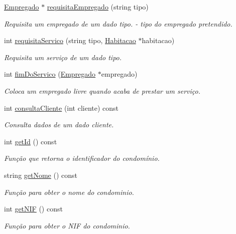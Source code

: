 \begin{DoxyCompactItemize}
\hyperlink{class_empregado}{Empregado} $\ast$ \hyperlink{class_condominio_a5eec0c5c3a1cb566332431939bcbcb56}{requisita\+Empregado} (string tipo)
\begin{DoxyCompactList}\small\item\em Requisita um empregado de um dado tipo.  -\/ tipo do empregado pretendido. \end{DoxyCompactList}\item 
int \hyperlink{class_condominio_adb5c91a9114dbc1c0f3c8c3e9f835152}{requisita\+Servico} (string tipo, \hyperlink{class_habitacao}{Habitacao} $\ast$habitacao)
\begin{DoxyCompactList}\small\item\em Requisita um serviço de um dado tipo. \end{DoxyCompactList}\item 
int \hyperlink{class_condominio_af2c2cdd83d43ea6641542efe01ff94b9}{fim\+Do\+Servico} (\hyperlink{class_empregado}{Empregado} $\ast$empregado)
\begin{DoxyCompactList}\small\item\em Coloca um empregado livre quando acaba de prestar um serviço. \end{DoxyCompactList}\item 
int \hyperlink{class_condominio_abfbd356bc26fde54dc40de2f9174f430}{consulta\+Cliente} (int cliente) const 
\begin{DoxyCompactList}\small\item\em Consulta dados de um dado cliente. \end{DoxyCompactList}\item 
int \hyperlink{class_condominio_a37df336e62f83189d9193f039e58935d}{get\+Id} () const 
\begin{DoxyCompactList}\small\item\em Função que retorna o identificador do condomínio. \end{DoxyCompactList}\item 
string \hyperlink{class_condominio_a7e358e29fa8b970fe11c8208aaadab95}{get\+Nome} () const 
\begin{DoxyCompactList}\small\item\em Função para obter o nome do condominio. \end{DoxyCompactList}\item 
int \hyperlink{class_condominio_a131891ab8b9ca504227ec3f9edcbc326}{get\+N\+IF} () const 
\begin{DoxyCompactList}\small\item\em Função para obter o N\+IF do condominio. \end{DoxyCompactList}\item 

\end{DoxyCompactItemize}
